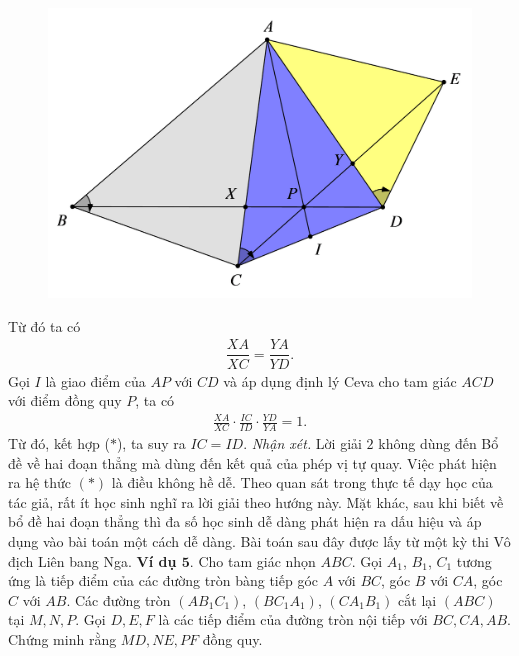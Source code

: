 \begin{multicols}{2}
	\begin{figure}[H]
		\vspace*{-5pt}
		\centering
		\captionsetup{labelformat= empty, justification=centering}
		\includegraphics[width= 1\linewidth]{10}
		\vspace*{-15pt}
	\end{figure}
	Từ đó ta có
	\begin{align*}
		\dfrac{XA}{XC} = \dfrac{YA}{YD}. \tag{$*$}
	\end{align*}
	Gọi $I$ là giao điểm của $AP$ với $CD$ và áp dụng định lý Ceva cho tam giác $ACD$ với điểm đồng quy $P$, ta có
	\begin{align*}
		\frac{XA}{XC}\cdot \frac{IC}{ID}\cdot\frac{YD}{YA} = 1.
	\end{align*}
	Từ đó, kết hợp ($*$), ta suy ra $IC=ID$.
	\vskip 0.1cm
	\textit{Nhận xét.}  Lời giải $2$ không dùng đến Bổ đề về hai đoạn thẳng mà dùng đến kết quả của phép vị tự quay. Việc phát hiện ra hệ thức $(*)$ là điều không hề dễ. Theo quan sát trong thực tế dạy học của tác giả, rất ít học sinh nghĩ ra  lời giải theo hướng này. Mặt khác, sau khi biết về bổ đề hai đoạn thẳng thì đa số học sinh dễ dàng phát hiện ra dấu hiệu và áp dụng vào bài toán một cách dễ dàng.
	\vskip 0.1cm
	Bài toán sau đây được lấy từ một kỳ thi Vô địch Liên bang Nga.
	\vskip 0.1cm
	\textbf{\color{diendantoanhoc}Ví dụ $\pmb{5.}$} Cho tam giác nhọn $ABC$. Gọi $A_1$, $B_1$, $C_1$ tương ứng là tiếp điểm của các đường tròn bàng tiếp góc $A$ với $BC$, góc $B$ với $CA$, góc $C$ với $AB$. Các đường tròn $(AB_1C_1)$, $(BC_1A_1)$, $(CA_1B_1)$ cắt lại $(ABC)$ tại $M,N,P$. Gọi $D,E,F$ là các tiếp điểm của đường tròn nội tiếp với $BC,CA,AB$. Chứng minh rằng $MD,NE,PF$ đồng quy.
	\begin{figure}[H]

\end{figure}
\end{multicols}
